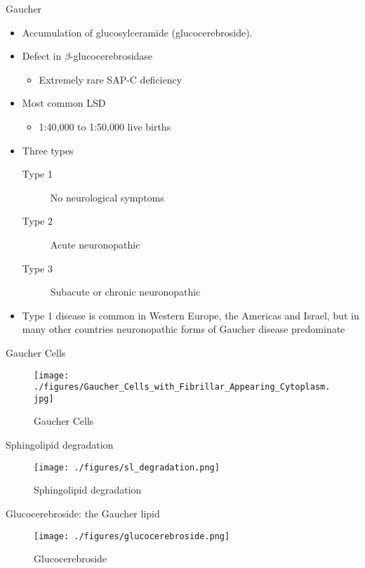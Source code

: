\documentclass[presentation, smaller]{beamer}
\begin{document}
\begin{frame}[label={sec:orgheadline1}]{Gaucher}
\begin{itemize}
\item Accumulation of glucosylceramide (glucocerebroside).
\item Defect in \(\beta\)-glucocerebrosidase
\begin{itemize}
\item Extremely rare SAP-C deficiency
\end{itemize}
\item Most common LSD
\begin{itemize}
\item 1:40,000 to 1:50,000 live births
\end{itemize}
\item Three types
\begin{description}
\item[{Type 1}] No neurological symptoms
\item[{Type 2}] Acute neuronopathic
\item[{Type 3}] Subacute or chronic neuronopathic
\end{description}
\item Type 1 disease is common in Western Europe, the Americas and Israel,
but in many other countries neuronopathic forms of Gaucher disease
predominate
\end{itemize}
\end{frame}


\begin{frame}[label={sec:orgheadline2}]{Gaucher Cells}
\begin{figure}[htb]
\centering
\texttt{[image: ./figures/Gaucher\_Cells\_with\_Fibrillar\_Appearing\_Cytoplasm.jpg]}
\caption[cells]{\label{fig:cells}
Gaucher Cells}
\end{figure}
\end{frame}




\begin{frame}[label={sec:orgheadline3}]{Sphingolipid degradation}
\begin{figure}[htb]
\centering
\texttt{[image: ./figures/sl\_degradation.png]}
\caption[deg]{\label{fig:sld}
Sphingolipid degradation}
\end{figure}
\end{frame}


\begin{frame}[label={sec:orgheadline4}]{Glucocerebroside: the Gaucher lipid}
\begin{figure}[htb]
\centering
\texttt{[image: ./figures/glucocerebroside.png]}
\caption[gluc]{\label{fig:gluc}
Glucocerebroside}
\end{figure}
\end{frame}
\end{document}
